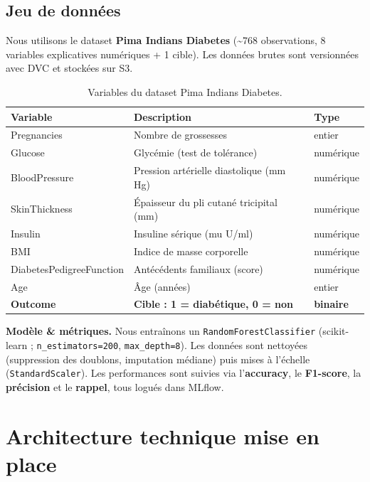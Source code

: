 \documentclass[11pt,a4paper]{article}
\begin{document}
\subsection*{Jeu de données}
Nous utilisons le dataset \textbf{Pima Indians Diabetes} (\textasciitilde768 observations, 8 variables
explicatives numériques + 1 cible). Les données brutes sont versionnées avec DVC et stockées sur S3.

\begin{table}[H]
\centering\small
\begin{tabular}{@{}lll@{}}
\toprule
\textbf{Variable} & \textbf{Description} & \textbf{Type} \\ \midrule
Pregnancies & Nombre de grossesses & entier \\
Glucose & Glycémie (test de tolérance) & numérique \\
BloodPressure & Pression artérielle diastolique (mm Hg) & numérique \\
SkinThickness & Épaisseur du pli cutané tricipital (mm) & numérique \\
Insulin & Insuline sérique (mu U/ml) & numérique \\
BMI & Indice de masse corporelle & numérique \\
DiabetesPedigreeFunction & Antécédents familiaux (score) & numérique \\
Age & Âge (années) & entier \\ \midrule
\textbf{Outcome} & \textbf{Cible : 1 = diabétique, 0 = non} & \textbf{binaire} \\ \bottomrule
\end{tabular}
\caption{Variables du dataset Pima Indians Diabetes.}
\end{table}

\noindent\textbf{Modèle \& métriques.} Nous entraînons un \texttt{RandomForestClassifier}
(scikit-learn ; \texttt{n\_estimators=200}, \texttt{max\_depth=8}). Les données sont nettoyées
(suppression des doublons, imputation médiane) puis mises à l'échelle (\texttt{StandardScaler}).
Les performances sont suivies via l'\textbf{accuracy}, le \textbf{F1-score}, la \textbf{précision}
et le \textbf{rappel}, tous logués dans MLflow.

\section{Architecture technique mise en place}
\end{document}
